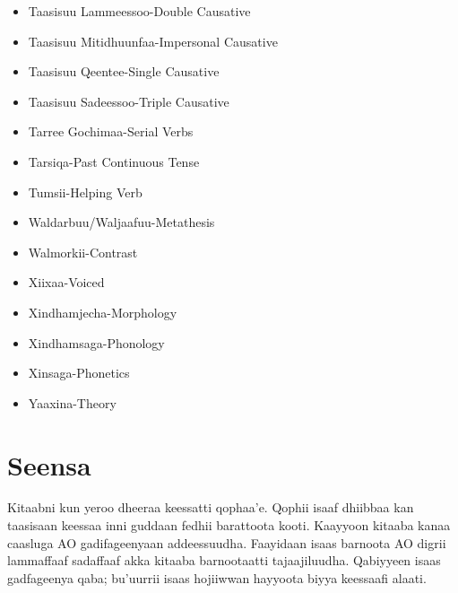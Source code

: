\documentclass[11pt,b5paper]{book}
\begin{document}
\begin{itemize}
	\item Taasisuu Lammeessoo-Double Causative
	\item Taasisuu Mitidhuunfaa-Impersonal Causative
	\item Taasisuu Qeentee-Single Causative
	\item Taasisuu Sadeessoo-Triple Causative
	\item Tarree Gochimaa-Serial Verbs
	\item Tarsiqa-Past Continuous Tense
	\item Tumsii-Helping Verb
	\item Waldarbuu/Waljaafuu-Metathesis
	\item Walmorkii-Contrast
	\item Xiixaa-Voiced
	\item Xindhamjecha-Morphology
	\item Xindhamsaga-Phonology
	\item Xinsaga-Phonetics
	\item Yaaxina-Theory
	
	
\end{itemize}


\newpage
\thispagestyle{empty}
\renewcommand{\contentsname}{Baafata}
\tableofcontents

\newpage
	


\chapter{Seensa}
\setlength{\parindent}{3em}

Kitaabni kun yeroo dheeraa keessatti qophaa’e. Qophii isaaf dhiibbaa kan taasisaan keessaa inni guddaan fedhii barattoota kooti. Kaayyoon kitaaba kanaa caasluga AO gadifageenyaan
addeessuudha. Faayidaan isaas barnoota AO digrii lammaffaaf sadaffaaf akka kitaaba barnootaatti tajaajiluudha. Qabiyyeen isaas gadfageenya qaba; bu’uurrii isaas hojiiwwan hayyoota
biyya keessaafi alaati.
\end{document}
